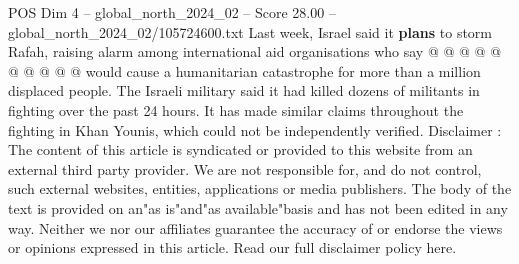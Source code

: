 \begin{textsample}{POS Dim 4 – global\_north\_2024\_02 – Score 28.00 – global\_north\_2024\_02/105724600.txt}
Last week, Israel said it \textbf{plans} to storm Rafah, raising alarm among international aid organisations who say @ @ @ @ @ @ @ @ @ @ would cause a humanitarian catastrophe for more than a million displaced people.
The Israeli military said it had killed dozens of militants in fighting over the past 24 hours.
It has made similar claims throughout the fighting in Khan Younis, which could not be independently verified.
Disclaimer : The content of this article is syndicated or provided to this website from an external third party provider.
We are not responsible for, and do not control, such external websites, entities, applications or media publishers.
The body of the text is provided on an"as is"and"as available"basis and has not been edited in any way.
Neither we nor our affiliates guarantee the accuracy of or endorse the views or opinions expressed in this article.
Read our full disclaimer policy here.

\end{textsample}
